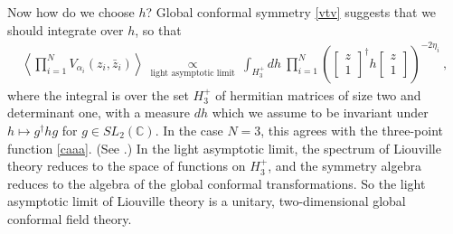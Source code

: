 \documentclass[12pt, a4paper, notitlepage, twoside]{report}
\numberwithin{equation}{section}
\theoremstyle{break}
\begin{document}
Now how do we choose $h$? Global conformal symmetry \eqref{vtv} suggests that we should integrate over $h$, so that
\begin{align}
\left\langle\prod_{i=1}^N V_{\alpha_i}(z_i,\bar{z}_i)\right\rangle\ \underset{\text{light\ asymptotic\ limit}}{\propto}\ \int_{H^+_3} dh\ \prod_{i=1}^N \left( \left[\begin{smallmatrix} z \\ 1 \end{smallmatrix}\right]^\dagger h \left[\begin{smallmatrix} z \\ 1 \end{smallmatrix}\right] \right)^{-2\eta_i}\ ,
\label{zih}
\end{align}
where the integral is over the set \textbf{\boldmath $H_3^+$} of hermitian matrices of size two and determinant one, with a measure $dh$ which we assume to be invariant under $h\mapsto g^\dagger hg$ for $g\in SL_2({\mathbb{C}})$.
In the case $N=3$, this agrees with the three-point function \eqref{caaa}. (See \cite{zz95}.) In the light asymptotic limit, the spectrum of Liouville theory reduces to the space of functions on $H_3^+$, and the symmetry algebra reduces to the algebra of the global conformal transformations.
So
the light asymptotic limit of Liouville theory is a unitary, two-dimensional global conformal field theory.
\end{document}

